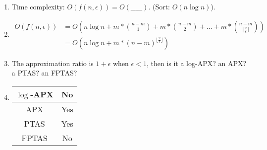 \documentclass[12pt,a4paper]{article}
\makeatletter
\newtheorem*{solution}{Solution}
\theoremstyle{definition}
\renewenvironment{solution}[1][Solution] {\par\pushQED{\qed}\normalfont\topsep6\p@\@plus6\p@\relax\trivlist\item[\hskip\labelsep\bfseries#1\@addpunct{.}]\ignorespaces}{\popQED\endtrivlist\@endpefalse} \makeatother
\makeatother
\begin{document}
\begin{enumerate}
\begin{enumerate}
\item Time complexity: $O(f(n,\epsilon))=O(\_\_\_\_\_)$. (Sort: $O(n\log n)$).
\begin{solution}
\begin{equation}
	\begin{aligned}
	O(f(n,\epsilon))
	&= O\left(n\log n + m*{n-m\choose1} + m*{n-m\choose2} + \dots + m*{n-m\choose\lfloor\frac{2}{\epsilon}\rfloor}\right)\\
	&= O\left(n\log n + m*(n-m)^{\lfloor\frac{2}{\epsilon}\rfloor}\right)
	\end{aligned}
\end{equation}
\end{solution}
\item The approximation ratio is $1+\epsilon$ when $\epsilon<1$, then is it a log-APX? an APX? a PTAS? an FPTAS?
\begin{solution}\quad\par
	\begin{table}[h]
	\centering
	\begin{tabular}{|c|c|}
		\hline
		$\log$-APX & No\\
		\hline
		APX & Yes\\
		\hline
		PTAS & Yes\\
		\hline
		FPTAS & No\\
		\hline
	\end{tabular}
	\end{table}
\end{solution}
\end{enumerate}

\end{enumerate}

\end{document}
